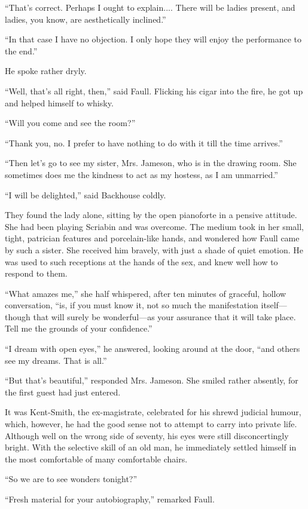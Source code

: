 ``That's correct. Perhaps I ought to explain.... There will be ladies present, and ladies, you know, 
are aesthetically inclined.''

``In that case I have no objection. I only hope they will enjoy the performance to the end.''

He spoke rather dryly.

``Well, that's all right, then,'' said Faull. Flicking his cigar into the fire, he got up and helped himself to
whisky.

``Will you come and see the room?''

``Thank you, no. I prefer to have nothing to do with it till the time arrives.''

``Then let's go to see my sister, Mrs. Jameson, who is in the drawing room. She sometimes does me the kindness to act as my hostess, as I am unmarried.''

``I will be delighted,'' said Backhouse coldly.

They found the lady alone, sitting by the open pianoforte in a pensive attitude. She had been playing Scriabin and was overcome. The medium took in her small, tight, patrician features and porcelain-like hands, and wondered how Faull came by such a sister. She received him bravely, with just a shade of quiet emotion. He was used to such receptions at the hands of the sex, and knew well how to respond to them.

``What amazes me,'' she half whispered, after ten minutes of graceful, hollow conversation, ``is, if you must know it, not so much the manifestation itself—though that will surely be wonderful—as your assurance that it will take place. Tell me the grounds of your confidence.''

``I dream with open eyes,'' he answered, looking around at the door, ``and others see my dreams. That is all.''

``But that's beautiful,'' responded Mrs. Jameson. She smiled rather absently, for the first guest had just entered.

It was Kent-Smith, the ex-magistrate, celebrated for his shrewd judicial humour, which, however, he had the good sense not to attempt to carry into private life. Although well on the wrong side of seventy, his eyes were still disconcertingly bright. With the selective skill of an old man, he immediately settled himself in the most comfortable of many comfortable chairs.

``So we are to see wonders tonight?''

``Fresh material for your autobiography,'' remarked Faull.

